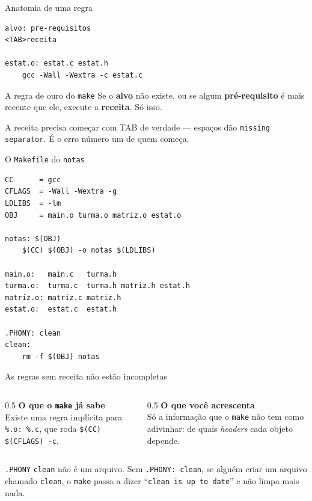 \documentclass[aspectratio=169]{beamer}
\begin{document}
\begin{frame}[fragile]{Anatomia de uma regra}
\begin{lstlisting}[style=makeStyle]
alvo: pre-requisitos
<TAB>receita

estat.o: estat.c estat.h
	gcc -Wall -Wextra -c estat.c
\end{lstlisting}
  \begin{block}{A regra de ouro do \texttt{make}}
    \small Se o \textbf{alvo} não existe, ou se algum \textbf{pré-requisito} é
    mais recente que ele, execute a \textbf{receita}. Só isso.
  \end{block}
  \begin{alertblock}{}
    \small A receita precisa começar com TAB de verdade --- espaços dão
    \texttt{missing separator}. É o erro número um de quem começa.
  \end{alertblock}
\end{frame}

\begin{frame}[fragile]{O \texttt{Makefile} do \texttt{notas}}
\begin{lstlisting}[style=makeStyle]
CC      = gcc
CFLAGS  = -Wall -Wextra -g
LDLIBS  = -lm
OBJ     = main.o turma.o matriz.o estat.o

notas: $(OBJ)
	$(CC) $(OBJ) -o notas $(LDLIBS)

main.o:   main.c   turma.h
turma.o:  turma.c  turma.h matriz.h estat.h
matriz.o: matriz.c matriz.h
estat.o:  estat.c  estat.h

.PHONY: clean
clean:
	rm -f $(OBJ) notas
\end{lstlisting}
\end{frame}

\begin{frame}[fragile]{As regras sem receita não estão incompletas}
  \begin{columns}[T]
    \begin{column}{0.5\textwidth}
      \textbf{O que o \texttt{make} já sabe}\\[0.3em]
      \small Existe uma regra implícita para \texttt{\%.o: \%.c}, que roda
      \texttt{\$(CC) \$(CFLAGS) -c}.
    \end{column}
    \begin{column}{0.5\textwidth}
      \textbf{O que você acrescenta}\\[0.3em]
      \small Só a informação que o \texttt{make} não tem como adivinhar: de
      quais \emph{headers} cada objeto depende.
    \end{column}
  \end{columns}
  \begin{block}{\texttt{.PHONY}}
    \small \texttt{clean} não é um arquivo. Sem \texttt{.PHONY: clean}, se
    alguém criar um arquivo chamado \texttt{clean}, o \texttt{make} passa a
    dizer ``\texttt{clean is up to date}'' e não limpa mais nada.
  \end{block}
\end{frame}
\end{document}
